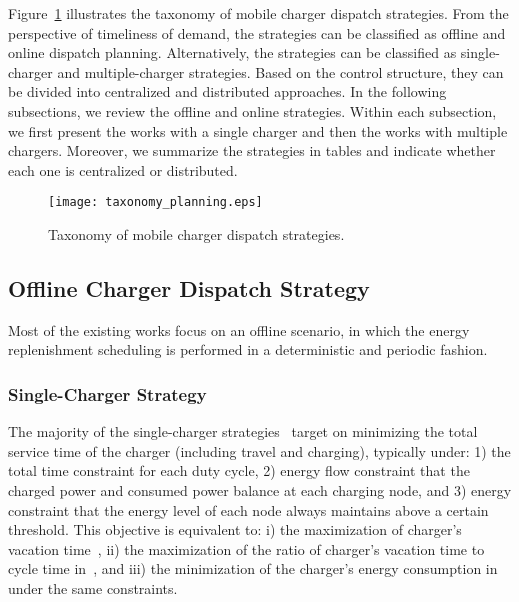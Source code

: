 \documentclass[twocolumn,10pt]{IEEEtran}
\begin{document}
 


Figure~\ref{taxonomy_planning} illustrates the taxonomy of mobile charger dispatch strategies. From the perspective of timeliness of demand, the strategies can be classified as offline and online dispatch planning. Alternatively, the strategies can be classified as single-charger and multiple-charger strategies. Based on the control structure, they can be divided into centralized and distributed approaches. In the following subsections, we review the offline and online strategies. Within each subsection, we first present the works with a single charger and then the works with multiple chargers. Moreover, we summarize the strategies in tables and indicate whether each one is centralized or distributed.

\begin{figure}
\centering
\texttt{[image: taxonomy\_planning.eps]}
\caption{Taxonomy of mobile charger dispatch strategies.} \label{taxonomy_planning}
\end{figure}

\subsection{Offline Charger Dispatch Strategy}
 

Most of the existing works focus on an offline scenario, in which the energy replenishment scheduling is performed in a deterministic and periodic fashion. 


\subsubsection{Single-Charger Strategy}

The majority of the single-charger strategies~\cite{L2012Xie,L2013Fu,Z2013Qin,L.2014Shi,L2013Xie,LXie2013,L2014Xie} target on minimizing the total service time of the charger (including travel and charging), typically under: 1) the total time constraint for each duty cycle, 2) energy flow constraint that the charged power and consumed power balance at each charging node,  and 3) energy constraint that the energy level of each node always maintains above a certain threshold. This objective is equivalent to: i) the maximization of charger's vacation time~\cite{Z2013Qin}, ii) the maximization of the ratio of charger's vacation time to cycle time in~\cite{L2012Xie}, and iii) the minimization of the charger's energy consumption in~\cite{LXie2013} under the same constraints.   
\end{document}
